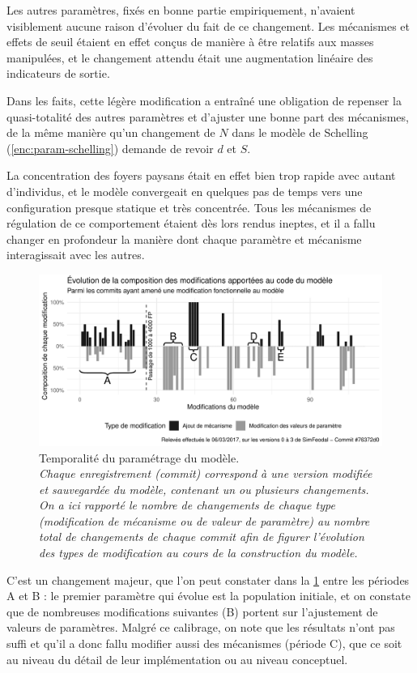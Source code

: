 Les autres paramètres, fixés en bonne partie empiriquement, n'avaient visiblement aucune raison d'évoluer du fait de ce changement.
Les mécanismes  et effets de seuil étaient en effet conçus de manière à être relatifs aux masses manipulées, et le changement attendu était une augmentation linéaire des indicateurs de sortie.


Dans les faits, cette légère modification a entraîné une obligation de repenser la quasi-totalité des autres paramètres et d'ajuster une bonne part des mécanismes, de la même manière qu'un changement de $N$ dans le modèle de Schelling (\cref{enc:param-schelling}) demande de revoir $d$ et $S$.

La concentration des foyers paysans était en effet bien trop rapide avec autant d'individus, et le modèle convergeait en quelques pas de temps vers une configuration presque statique et très concentrée.
Tous les mécanismes de régulation de ce comportement étaient dès lors rendus ineptes, et il a fallu changer en profondeur la manière dont chaque paramètre et mécanisme interagissait avec les autres.

\begin{figure}[H]
	\includegraphics[width = \linewidth]{img/plotComits_clean.pdf}
	\caption[Temporalité du paramétrage du modèle.]{Temporalité du paramétrage du modèle.\\
\textit{	Chaque \og enregistrement\fg{} (\textit{commit}) correspond à une version modifiée et sauvegardée du modèle, contenant un ou plusieurs changements.
	On a ici rapporté le nombre de changements de chaque type (modification de mécanisme ou de valeur de paramètre) au nombre total de changements de chaque \textit{commit} afin de figurer l'évolution des types de modification au cours de la construction du modèle.}
	}
	\label{fig:comits-periodes}
\end{figure}

C'est un changement majeur, que l'on peut constater dans la \cref{fig:comits-periodes} entre les périodes \og A\fg{} et \og B\fg{} :
le premier paramètre qui évolue est la population initiale, et on constate que de nombreuses modifications suivantes (B) portent sur l'ajustement de valeurs de paramètres.
Malgré ce calibrage, on note que les résultats n'ont pas suffi et qu'il a donc fallu modifier aussi des mécanismes (période C), que ce soit au niveau du détail de leur implémentation ou au niveau conceptuel.

